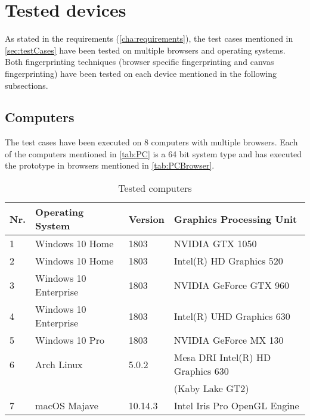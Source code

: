 \section{Tested devices}\label{sec:testdevices}

As stated in the requirements (\autoref{cha:requirements}), the test cases mentioned in \autoref{sec:testCases} have been tested on multiple browsers and operating systems. Both fingerprinting techniques (browser specific fingerprinting and canvas fingerprinting) have been tested on each device mentioned in the following subsections.

\subsection{Computers}
The test cases have been executed on 8 computers with multiple browsers. Each of the computers mentioned in \autoref{tab:PC} is a 64 bit system type and has executed the prototype in browsers mentioned in \autoref{tab:PCBrowser}.

\begin{table}[h]
	\centering
	\begin{tabular}{llll}
		Nr. & Operating System & Version & Graphics Processing Unit \\ \hline
		\rule{0pt}{15pt}1 & Windows 10 Home & 1803 & NVIDIA GTX 1050 \\
		2 & Windows 10 Home & 1803 & Intel(R) HD Graphics 520 \\
		3 & Windows 10 Enterprise & 1803 & NVIDIA GeForce GTX 960 \\
		4 & Windows 10 Enterprise & 1803 & Intel(R) UHD Graphics 630 \\
		5 & Windows 10 Pro & 1803 & NVIDIA GeForce MX 130 \\
		6 & Arch Linux & 5.0.2 & Mesa DRI Intel(R) HD Graphics 630 \\&&& (Kaby Lake GT2) \\
		7 & macOS Majave & 10.14.3 & Intel Iris Pro OpenGL Engine
	\end{tabular}
\caption{Tested computers}
\label{tab:PC}
\end{table}


